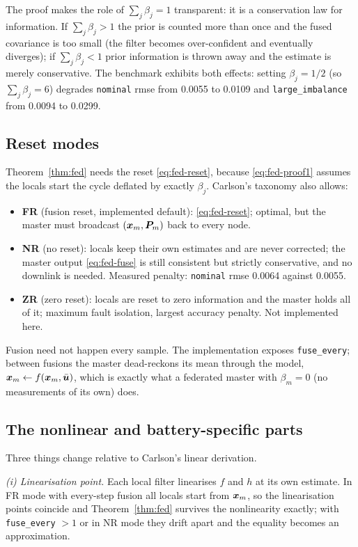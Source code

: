 The proof makes the role of $\sum_j\beta_j = 1$ transparent: it is a conservation law for
information. If $\sum_j\beta_j>1$ the prior is counted more than once and the fused covariance is
too small (the filter becomes over-confident and eventually diverges); if $\sum_j\beta_j<1$ prior
information is thrown away and the estimate is merely conservative. The benchmark exhibits both
effects: setting $\beta_j=1/2$ (so $\sum_j\beta_j=6$) degrades \texttt{nominal} rmse from
\num{0.0055} to \num{0.0109} and \texttt{large\_imbalance} from \num{0.0094} to \num{0.0299}.

\subsection{Reset modes}
Theorem~\ref{thm:fed} needs the reset \eqref{eq:fed-reset}, because \eqref{eq:fed-proof1} assumes
the locals start the cycle deflated by exactly $\beta_j$. Carlson's taxonomy
\cite[Tab.~I]{carlson1990federated} also allows:
\begin{itemize}[nosep]
\item \textbf{FR} (fusion reset, implemented default): \eqref{eq:fed-reset}; optimal, but the
      master must broadcast $(\bm{x}_m,\bm{P}_m)$ back to every node.
\item \textbf{NR} (no reset): locals keep their own estimates and are never corrected; the master
      output \eqref{eq:fed-fuse} is still consistent but strictly conservative, and no downlink
      is needed. Measured penalty: \texttt{nominal} rmse \num{0.0064} against \num{0.0055}.
\item \textbf{ZR} (zero reset): locals are reset to zero information and the master holds all of
      it; maximum fault isolation, largest accuracy penalty. Not implemented here.
\end{itemize}
Fusion need not happen every sample. The implementation exposes \texttt{fuse\_every}; between
fusions the master dead-reckons its mean through the model, $\bm{x}_m\leftarrow f(\bm{x}_m,\bar{\bm{u}})$,
which is exactly what a federated master with $\beta_m=0$ (no measurements of its own) does.

\subsection{The nonlinear and battery-specific parts}
Three things change relative to Carlson's linear derivation.

\emph{(i) Linearisation point.} Each local filter linearises $f$ and $h$ at its own estimate. In
FR mode with every-step fusion all locals start from $\bm{x}_m$, so the linearisation points
coincide and Theorem~\ref{thm:fed} survives the nonlinearity exactly; with \texttt{fuse\_every}
$>1$ or in NR mode they drift apart and the equality becomes an approximation.

